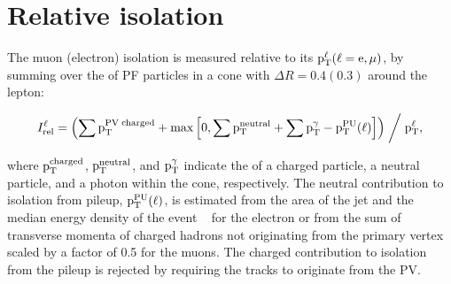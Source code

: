 \section{Relative isolation}
\label{isolation}
The muon (electron) isolation is measured relative to its $\text{p}_\text{T}^\ell (\ell=\text{e},\mu)$, by summing over the \pt of PF particles in a cone with $\Delta R=0.4(0.3)$ around the lepton:
\begin{linenomath*}
  \begin{equation*}
    I^\ell_{\text{rel}} = \left( \sum \text{p}_\text{T}^{\text{PV\;charged}} + \text{max}\left[0, \sum \text{p}_\text{T}^{\text{neutral}} + \sum \text{p}_\text{T}^{\gamma} - \text{p}_\text{T}^{\text{PU}}(\ell)\right]\right) \biggm/ \text{p}_\text{T}^\ell,
  \end{equation*}
\end{linenomath*}
where $\text{p}_\text{T}^\text{charged}$, $\text{p}_\text{T}^\text{neutral}$, and $\text{p}_\text{T}^{\gamma}$ indicate the \pt of a charged particle, a neutral particle, and a photon within the cone, respectively. The neutral contribution to isolation from pileup, $\text{p}_\text{T}^\text{PU}(\ell)$, is estimated from the area of the jet and the median energy density of the event ~\cite{Cacciari:2008gn, Cacciari:2007fd} for the electron or from the sum of transverse momenta of charged hadrons not originating from the primary vertex scaled by a factor of 0.5 for the muons. The charged contribution to isolation from the pileup is rejected by requiring the tracks to originate from the PV.

%
%
